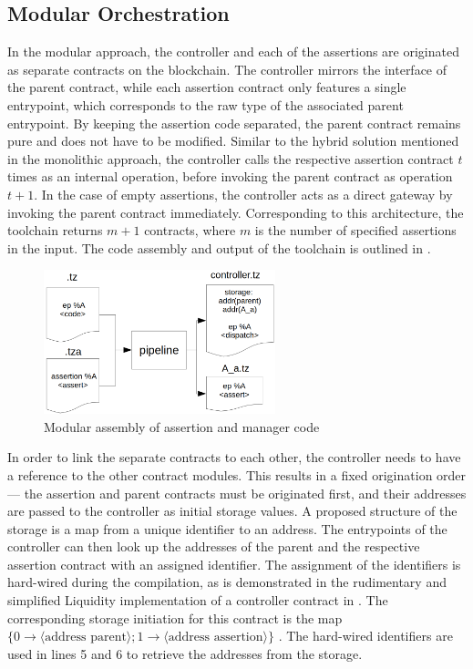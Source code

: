 \subsection{Modular Orchestration}\label{sec:modular}
In the modular approach, the controller and each of the assertions are originated as separate contracts on the blockchain. The controller mirrors the interface of the parent contract, while each assertion contract only features a single entrypoint, which corresponds to the raw type of the associated parent entrypoint. By keeping the assertion code separated, the parent contract remains pure and does not have to be modified. Similar to the hybrid solution mentioned in the monolithic approach, the controller calls the respective assertion contract $t$ times as an internal operation, before invoking the parent contract as operation $t+1$. In the case of empty assertions, the controller acts as a direct gateway by invoking the parent contract immediately. Corresponding to this architecture, the toolchain returns $m + 1$ contracts, where $m$ is the number of specified assertions in the input. The code assembly and output of the toolchain is outlined in .
\begin{figure}[h]
\centering
  \includegraphics[width=0.6\textwidth]{figures/5-offline_tezos/pipeline_output_modular.png}
	\caption{Modular assembly of assertion and manager code}
	\label{fig:modular_assembly}
\end{figure}

In order to link the separate contracts to each other, the controller needs to have a reference to the other contract modules. This results in a fixed origination order --- the assertion and parent contracts must be originated first, and their addresses are passed to the controller as initial storage values. A proposed structure of the storage is a map from a unique identifier to an address. The entrypoints of the controller can then look up the addresses of the parent and the respective assertion contract with an assigned identifier. The assignment of the identifiers is hard-wired during the compilation, as is demonstrated in the rudimentary and simplified Liquidity implementation of a controller contract in . The corresponding storage initiation for this contract is the map $\lbrace 0 \rightarrow \langle \text{address parent} \rangle; 1 \rightarrow \langle \text{address assertion} \rangle \rbrace$ . The hard-wired identifiers are used in lines 5 and 6 to retrieve the addresses from the storage.



